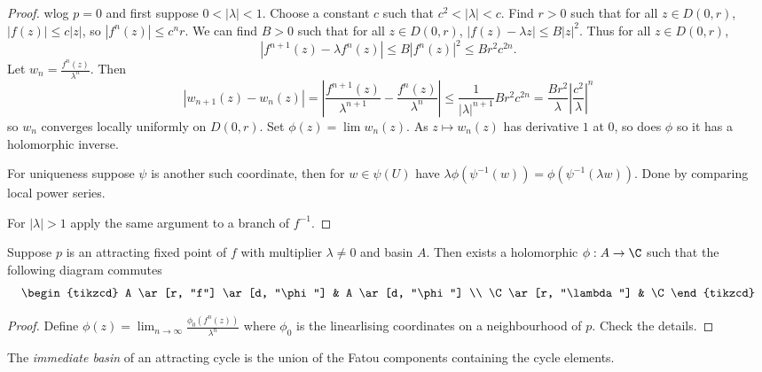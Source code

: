 \documentclass[a4paper]{article}
\begin{document}
\begin{proof}
  wlog \(p = 0\) and first suppose \(0 < |\lambda| < 1\). Choose a constant \(c\) such that \(c^2 < |\lambda| < c\). Find \(r > 0\) such that for all \(z \in D(0, r)\), \(|f(z)| \leq c |z|\), so \(|f^n(z)| \leq c^n r\). We can find \(B > 0\) such that for all \(z \in D(0, r)\), \(|f(z) - \lambda z| \leq B |z|^2\). Thus for all \(z \in D(0, r)\),
  \[
    |f^{n + 1}(z) - \lambda f^n(z)| \leq B |f^n(z)|^2 \leq B r^2 c^{2n}.
  \]
  Let \(w_n = \frac{f^n(z)}{\lambda^n}\). Then
  \[
    |w_{n + 1}(z) - w_n(z)|
    = \left| \frac{f^{n + 1}(z)}{\lambda^{n + 1}} - \frac{f^n(z)}{\lambda^n} \right|
    \leq \frac{1}{|\lambda|^{n + 1}} Br^2 c^{2n}
    = \frac{Br^2}{\lambda} \left|\frac{c^2}{\lambda}\right|^n
  \]
  so \(w_n\) converges locally uniformly on \(D(0, r)\). Set \(\phi(z) = \lim w_n(z)\). As \(z \mapsto w_n(z)\) has derivative \(1\) at \(0\), so does \(\phi\) so it has a holomorphic inverse.

  For uniqueness suppose \(\psi\) is another such coordinate, then for \(w \in \psi(U)\) have \(\lambda \phi(\psi^{-1}(w)) = \phi(\psi^{-1}(\lambda w))\). Done by comparing local power series.

  For \(|\lambda| > 1\) apply the same argument to a branch of \(f^{-1}\).
\end{proof}

\begin{corollary}
  Suppose \(p\) is an attracting fixed point of \(f\) with multiplier \(\lambda \ne 0\) and basin \(A\). Then exists a holomorphic \(\phi: A \to \C\) such that the following diagram commutes
  \[
    \begin{tikzcd}
      A \ar[r, "f"] \ar[d, "\phi"] & A \ar[d, "\phi"] \\
      \C \ar[r, "\lambda"] & \C
    \end{tikzcd}
  \]
\end{corollary}

\begin{proof}
  Define \(\phi(z) = \lim_{n \to \infty} \frac{\phi_0(f^n(z))}{\lambda^n}\) where \(\phi_0\) is the linearlising coordinates on a neighbourhood of \(p\). Check the details.
\end{proof}

\begin{definition}
  The \emph{immediate basin} of an attracting cycle is the union of the Fatou components containing the cycle elements.
\end{definition}
\end{document}
